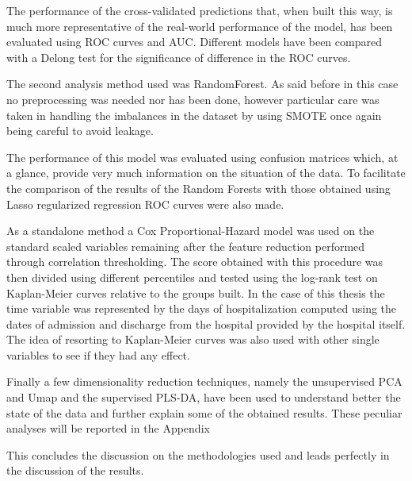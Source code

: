 The performance of the cross-validated predictions that, when built this way, is much more representative of the real-world performance of the model, has been evaluated using ROC curves and AUC.
Different models have been compared with a Delong test\cite{Delong} for the significance of difference in the ROC curves.

The second analysis method used was RandomForest. As said before in this case no preprocessing was needed nor has been done, however particular care was taken in handling the imbalances in the dataset by using SMOTE \cite{SMOTE} once again being careful to avoid leakage. 

The performance of this model was evaluated using confusion matrices which, at a glance, provide very much information on the situation of the data.
To facilitate the comparison of the results of the Random Forests with those obtained using Lasso regularized regression ROC curves were also made.

As a standalone method a Cox Proportional-Hazard model was used on the standard scaled variables remaining after the feature reduction performed through correlation thresholding. 
The score obtained with this procedure was then divided using different percentiles and tested using the log-rank test on Kaplan-Meier curves relative to the groups built.
In the case of this thesis the time variable was represented by the days of hospitalization computed using the dates of admission and discharge from the hospital provided by the hospital itself.
The idea of resorting to Kaplan-Meier curves was also used with other single variables to see if they had any effect. 

Finally a few dimensionality reduction techniques, namely the unsupervised PCA\cite{PCA} and Umap \cite{UMAP} and the supervised PLS-DA\cite{PLSDA}, have been used to understand better the state of the data and further explain some of the obtained results.
These peculiar analyses will be reported in the Appendix 

This concludes the discussion on the methodologies used and leads perfectly in the discussion of the results.









